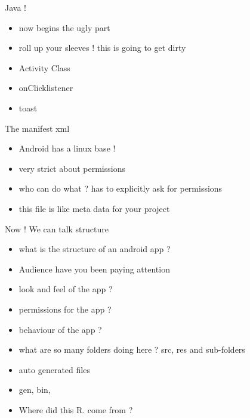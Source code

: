 \documentclass[11pt]{beamer}
\begin{document}
\begin{frame}[containsverbatim]{Java !}
	\begin{flushleft}
	\begin{itemize}
		\item now begins the ugly part 
		\item roll up your sleeves ! this is going to get dirty
		\item Activity Class
		\item onClicklistener
		\item toast 
	\end{itemize}
	\end{flushleft}
\end{frame}


\begin{frame}[containsverbatim]{The manifest xml}
	\begin{flushleft}
	\begin{itemize}
		\item Android has a linux base !
		\item very strict about permissions
		\item who can do what ? has to explicitly ask for permissions
		\item this file is like meta data for your project

	\end{itemize}
	\end{flushleft}
\end{frame}


\begin{frame}[containsverbatim]{Now ! We can talk structure }
	\begin{flushleft}
	\begin{itemize}
		\item what is the structure of an android app ?
		\item Audience have you been paying attention
		\item look and feel of the app ?
		\item permissions for the app ?
		\item behaviour of the app ?
		\item what are so many folders doing here ? 
	          src, res and sub-folders
		\item auto generated files
		\item gen, bin, 
		\item Where did this R. come from ?
	\end{itemize}
	\end{flushleft}
\end{frame}
\end{document}
